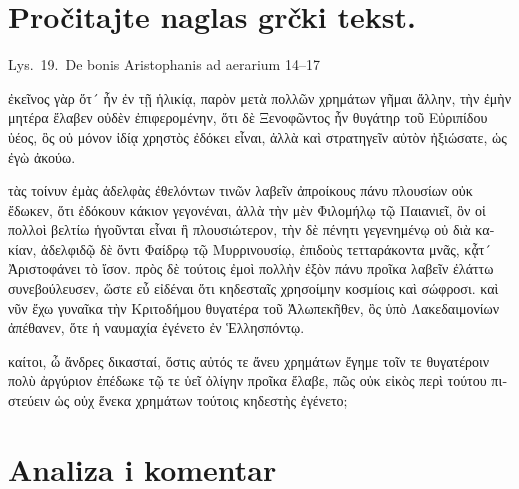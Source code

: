 
\section*{Pročitajte naglas grčki tekst.}

Lys.\ 19.\ De bonis Aristophanis ad aerarium 14–17


\medskip


{\large

\begin{greek}

\noindent  ἐκεῖνος γὰρ ὅτ´ ἦν ἐν τῇ ἡλικίᾳ, παρὸν μετὰ πολλῶν χρημάτων γῆμαι ἄλλην, τὴν ἐμὴν μητέρα ἔλαβεν οὐδὲν ἐπιφερομένην, ὅτι δὲ Ξενοφῶντος ἦν θυγάτηρ τοῦ Εὐριπίδου ὑέος, ὃς οὐ μόνον ἰδίᾳ χρηστὸς ἐδόκει εἶναι, ἀλλὰ καὶ στρατηγεῖν αὐτὸν ἠξιώσατε, ὡς ἐγὼ ἀκούω.

τὰς τοίνυν ἐμὰς ἀδελφὰς ἐθελόντων τινῶν λαβεῖν ἀπροίκους πάνυ πλουσίων οὐκ ἔδωκεν, ὅτι ἐδόκουν κάκιον γεγονέναι, ἀλλὰ τὴν μὲν Φιλομήλῳ τῷ Παιανιεῖ, ὃν οἱ πολλοὶ βελτίω ἡγοῦνται εἶναι ἢ πλουσιώτερον, τὴν δὲ πένητι γεγενημένῳ οὐ διὰ κακίαν, ἀδελφιδῷ δὲ ὄντι Φαίδρῳ τῷ Μυρρινουσίῳ, ἐπιδοὺς τετταράκοντα μνᾶς, κᾆτ´ Ἀριστοφάνει τὸ ἴσον. πρὸς δὲ τούτοις ἐμοὶ πολλὴν ἐξὸν πάνυ προῖκα λαβεῖν ἐλάττω συνεβούλευσεν, ὥστε εὖ εἰδέναι ὅτι κηδεσταῖς χρησοίμην κοσμίοις καὶ σώφροσι. καὶ νῦν ἔχω γυναῖκα τὴν Κριτοδήμου θυγατέρα τοῦ Ἀλωπεκῆθεν, ὃς ὑπὸ Λακεδαιμονίων ἀπέθανεν, ὅτε ἡ ναυμαχία ἐγένετο ἐν Ἑλλησπόντῳ.

καίτοι, ὦ ἄνδρες δικασταί, ὅστις αὐτός τε ἄνευ χρημάτων ἔγημε τοῖν τε θυγατέροιν πολὺ ἀργύριον ἐπέδωκε τῷ τε ὑεῖ ὀλίγην προῖκα ἔλαβε, πῶς οὐκ εἰκὸς περὶ τούτου πιστεύειν ὡς οὐχ ἕνεκα χρημάτων τούτοις κηδεστὴς ἐγένετο;


\end{greek}

}


\section*{Analiza i komentar}



